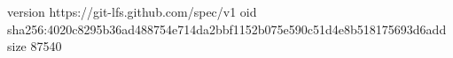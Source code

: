 version https://git-lfs.github.com/spec/v1
oid sha256:4020c8295b36ad488754e714da2bbf1152b075e590c51d4e8b518175693d6add
size 87540
